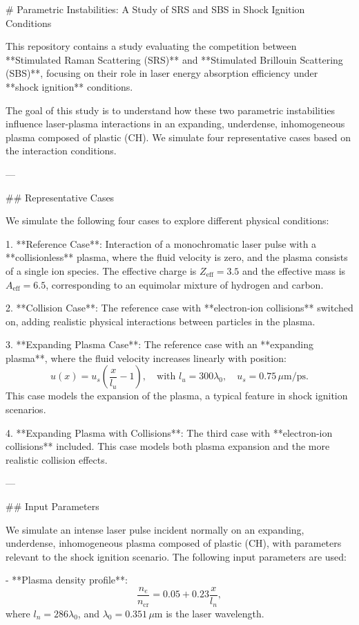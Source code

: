 # Parametric Instabilities: A Study of SRS and SBS in Shock Ignition Conditions

This repository contains a study evaluating the competition between **Stimulated Raman Scattering (SRS)** and **Stimulated Brillouin Scattering (SBS)**, focusing on their role in laser energy absorption efficiency under **shock ignition** conditions.

The goal of this study is to understand how these two parametric instabilities influence laser-plasma interactions in an expanding, underdense, inhomogeneous plasma composed of plastic (CH). We simulate four representative cases based on the interaction conditions.

---

## Representative Cases

We simulate the following four cases to explore different physical conditions:

1. **Reference Case**:  
   Interaction of a monochromatic laser pulse with a **collisionless** plasma, where the fluid velocity is zero, and the plasma consists of a single ion species. The effective charge is \( Z_{\text{eff}} = 3.5 \) and the effective mass is \( A_{\text{eff}} = 6.5 \), corresponding to an equimolar mixture of hydrogen and carbon.

2. **Collision Case**:  
   The reference case with **electron-ion collisions** switched on, adding realistic physical interactions between particles in the plasma.

3. **Expanding Plasma Case**:  
   The reference case with an **expanding plasma**, where the fluid velocity increases linearly with position:
   \[
   u(x) = u_s \left( \frac{x}{l_u} - 1 \right), \quad \text{with } l_u = 300 \lambda_0, \quad u_s = 0.75 \,\mu\text{m}/\text{ps}.
   \]
   This case models the expansion of the plasma, a typical feature in shock ignition scenarios.

4. **Expanding Plasma with Collisions**:  
   The third case with **electron-ion collisions** included. This case models both plasma expansion and the more realistic collision effects.

---

## Input Parameters

We simulate an intense laser pulse incident normally on an expanding, underdense, inhomogeneous plasma composed of plastic (CH), with parameters relevant to the shock ignition scenario. The following input parameters are used:

- **Plasma density profile**:
  \[
  \frac{n_e}{n_{\text{cr}}} = 0.05 + 0.23 \frac{x}{l_n},
  \]
  where \( l_n = 286 \lambda_0 \), and \( \lambda_0 = 0.351 \,\mu\text{m} \) is the laser wavelength.

